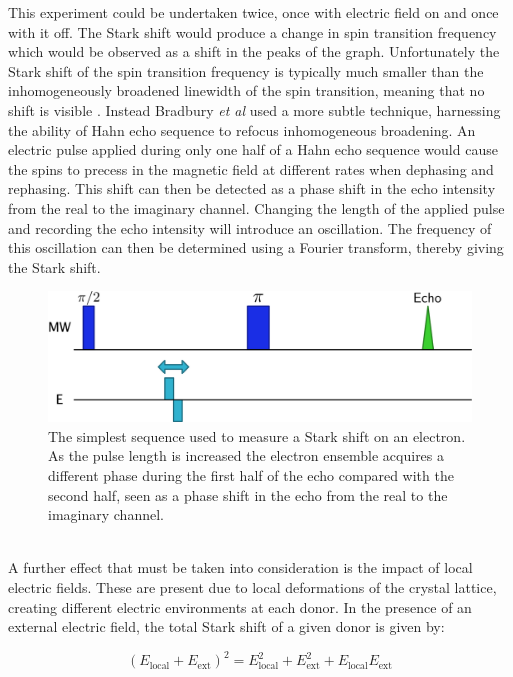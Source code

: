 This experiment could be undertaken twice, once with electric field on and once with it off.
The Stark shift would produce a change in spin transition frequency which would be observed as a shift in the peaks of the graph.
Unfortunately the Stark shift of the spin transition frequency is typically much smaller than the inhomogeneously broadened linewidth of the spin transition, meaning that no shift is visible \cite{Bradbury2007}.
Instead Bradbury \emph{et al} used a more subtle technique, harnessing the ability of Hahn echo sequence to refocus inhomogeneous broadening.
An electric pulse applied during only one half of a Hahn echo sequence would cause the spins to precess in the magnetic field at different rates when dephasing and rephasing.
This shift can then be detected as a phase shift in the echo intensity from the real to the imaginary channel.
Changing the length of the applied pulse and recording the echo intensity will introduce an oscillation.
The frequency of this oscillation can then be determined using a Fourier transform, thereby giving the Stark shift.
\begin{figure}
\centering
\includegraphics[width=\columnwidth]{Figures/StarkShiftSequenceBasic.pdf}
\caption[Stark shift sequence]{The simplest sequence used to measure a Stark shift on an electron. As the pulse length is increased the electron ensemble acquires a different phase during the first half of the echo compared with the second half, seen as a phase shift in the echo from the real to the imaginary channel.}
\label{fig:starkseq}
\end{figure}
\\
A further effect that must be taken into consideration is the impact of local electric fields.
These are present due to local deformations of the crystal lattice, creating different electric environments at each donor.
In the presence of an external electric field, the total Stark shift of a given donor is given by:

\begin{equation}
\left (E_{\text{local}} + E_{\text{ext}} \right)^2 = E_{\text{local}}^2 + E_{\text{ext}}^2 + E_{\text{local}}E_{\text{ext}}
\end{equation}

